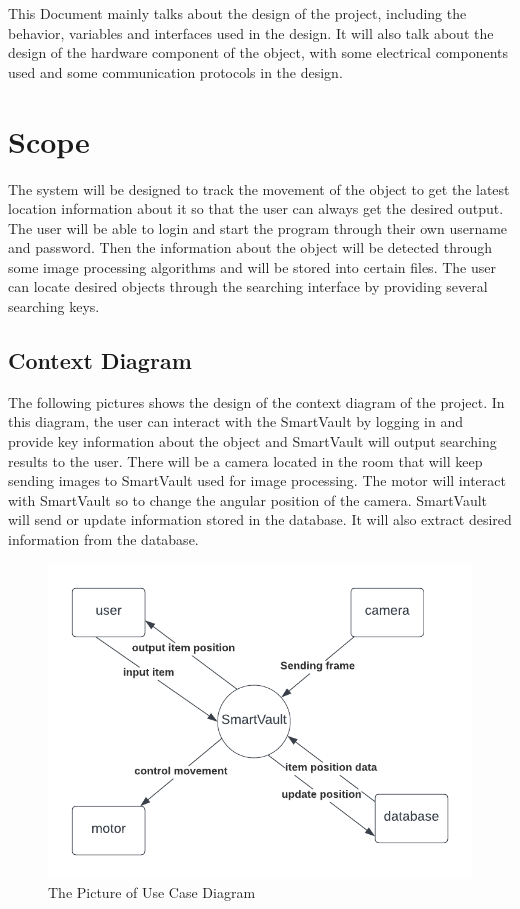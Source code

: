 \documentclass[12pt, titlepage]{article}
\begin{document}
This Document mainly talks about the design of the project, including the behavior, variables and interfaces used in the design. It will also talk about the design of the hardware component of the object, with some electrical components used and some communication protocols in the design.

\section{Scope}

The system will be designed to track the movement of the object to get the latest location information about it so that the user can always get the desired output. The user will be able to login and start the program through their own username and password. Then the information about the object will be detected through some image processing algorithms and will be stored into certain files. The user can locate desired objects through the searching interface by providing several searching keys. 


\subsection{Context Diagram}

The following pictures shows the design of the context diagram of the project. In this diagram, the user can interact with the SmartVault by logging in and provide key information about the object and SmartVault will output searching results to the user. There will be a camera located in the room that will keep sending images to SmartVault used for image processing. The motor will interact with SmartVault so to change the angular position of the camera. SmartVault will send or update information stored in the database. It will also extract desired information from the database. 

\begin{figure}[H]
    \centering
    \includegraphics[scale=0.8]{work_context.png}
    \caption{The Picture of Use Case Diagram}
\end{figure}
\end{document}
